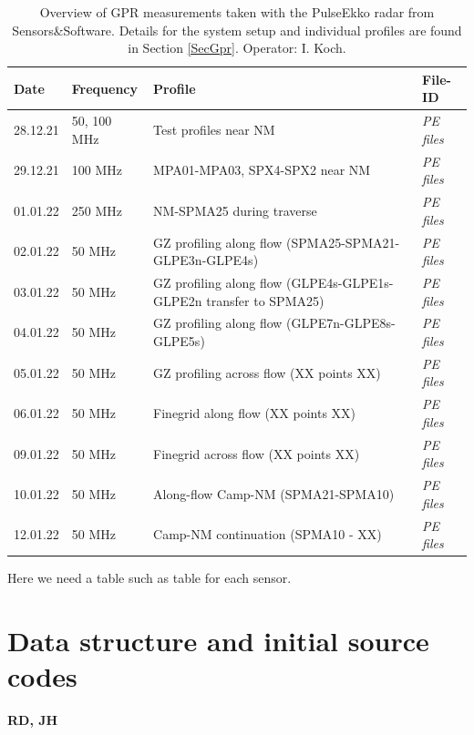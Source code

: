 \documentclass[a4paper,12pt]{article}
\begin{document}
\begin{table}
  \begin{tabular}{m{1.5cm} m{2.25cm} m{7cm} m{3cm}}
    \rowcolor{gray!50}
    Date & Frequency & Profile & File-ID\\
    \hline
    28.12.21 & 50, 100 MHz & Test profiles near NM& \textit{PE files}\\
    29.12.21 & 100 MHz & MPA01-MPA03, SPX4-SPX2 near NM& \textit{PE files}\\
    01.01.22 & 250 MHz  & NM-SPMA25 during traverse& \textit{PE files}\\
    02.01.22 & 50 MHz & GZ profiling along flow (SPMA25-SPMA21-GLPE3n-GLPE4s)& \textit{PE files}\\
    03.01.22 & 50 MHz & GZ profiling along flow (GLPE4s-GLPE1s-GLPE2n transfer to SPMA25)& \textit{PE files}\\
    04.01.22 & 50 MHz & GZ profiling along flow (GLPE7n-GLPE8s-GLPE5s)& \textit{PE files}\\
    05.01.22 & 50 MHz & GZ profiling across flow (XX points XX)& \textit{PE files}\\
    06.01.22 & 50 MHz & Finegrid along flow (XX points XX)& \textit{PE files}\\
    09.01.22 & 50 MHz & Finegrid across flow (XX points XX)& \textit{PE files}\\
    10.01.22 & 50 MHz & Along-flow Camp-NM (SPMA21-SPMA10)& \textit{PE files}\\
    12.01.22 & 50 MHz & Camp-NM continuation (SPMA10 - XX)& \textit{PE files}\\
    \hline
  \end{tabular}
  \caption{\label{TableGPR}Overview of GPR measurements taken with the PulseEkko radar from Sensors\&Software. Details for the system setup and individual profiles are found in Section \ref{SecGpr}. Operator: I. Koch.}
Here we need a table such as table \label{TableGPR} for each sensor. 
\end{table}
\pagebreak
\section{Data structure and initial source codes}
\textbf{RD, JH}
\pagebreak
\end{document}
